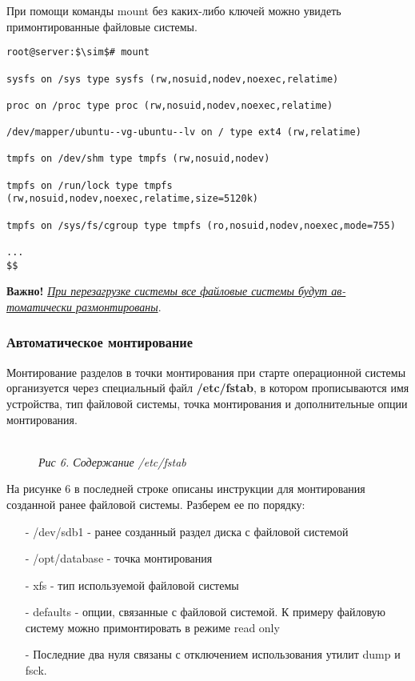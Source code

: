 \documentclass[14pt, a4paper]{article}
\begin{document}
При помощи команды \colorbox{backcolour}{mount} без каких-либо ключей можно увидеть примонтированные файловые
системы.

\begin{lstlisting}
root@server:$\sim$# mount

sysfs on /sys type sysfs (rw,nosuid,nodev,noexec,relatime)

proc on /proc type proc (rw,nosuid,nodev,noexec,relatime)

/dev/mapper/ubuntu--vg-ubuntu--lv on / type ext4 (rw,relatime)

tmpfs on /dev/shm type tmpfs (rw,nosuid,nodev)

tmpfs on /run/lock type tmpfs (rw,nosuid,nodev,noexec,relatime,size=5120k)

tmpfs on /sys/fs/cgroup type tmpfs (ro,nosuid,nodev,noexec,mode=755)

...
$$
\end{lstlisting}

\vspace{0.2cm}

\textbf{Важно!} \underline{\textit{При перезагрузке системы все файловые системы будут ав-}} \\
\underline{\textit{томатически размонтированы}}.

\subsubsection*{Автоматическое монтирование} 

Монтирование разделов в точки монтирования при старте операционной системы организуется через
специальный файл \textbf{/etc/fstab}, в котором прописываются имя устройства, тип файловой системы,
точка монтирования и дополнительные опции монтирования.

\begin{figure}[h]
    \centering
    \\ 
    \small\textit{Рис 6. Содержание /etc/fstab}  
    \label{framework} 
\end{figure}

На рисунке 6 в последней строке описаны инструкции для монтирования созданной ранее файловой
системы. Разберем ее по порядку:

\begin{itemize}
    \item[-] /dev/sdb1 - ранее созданный раздел диска с файловой системой
    \item[-] /opt/database - точка монтирования
    \item[-] xfs - тип используемой файловой системы
    \item[-] defaults - опции, связанные с файловой системой. К примеру файловую систему можно
    примонтировать в режиме read only
    \item[-] Последние два нуля связаны с отключением использования утилит dump и fsck.
\end{itemize}
\end{document}
